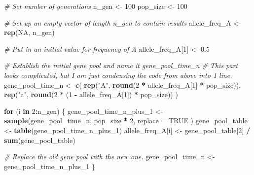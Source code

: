 \documentclass[
  a4paper]{book}
\newenvironment{Shaded}{\begin{snugshade}}{\end{snugshade}}
\newcommand{\AttributeTok}[1]{\textcolor[rgb]{0.13,0.29,0.53}{#1}}
\newcommand{\CommentTok}[1]{\textcolor[rgb]{0.56,0.35,0.01}{\textit{#1}}}
\newcommand{\ConstantTok}[1]{\textcolor[rgb]{0.56,0.35,0.01}{#1}}
\newcommand{\ControlFlowTok}[1]{\textcolor[rgb]{0.13,0.29,0.53}{\textbf{#1}}}
\newcommand{\DecValTok}[1]{\textcolor[rgb]{0.00,0.00,0.81}{#1}}
\newcommand{\FloatTok}[1]{\textcolor[rgb]{0.00,0.00,0.81}{#1}}
\newcommand{\FunctionTok}[1]{\textcolor[rgb]{0.13,0.29,0.53}{\textbf{#1}}}
\newcommand{\NormalTok}[1]{#1}
\newcommand{\OtherTok}[1]{\textcolor[rgb]{0.56,0.35,0.01}{#1}}
\newcommand{\SpecialCharTok}[1]{\textcolor[rgb]{0.81,0.36,0.00}{\textbf{#1}}}
\newcommand{\StringTok}[1]{\textcolor[rgb]{0.31,0.60,0.02}{#1}}
\begin{document}
\begin{Shaded}
\begin{Highlighting}[]
\CommentTok{\# Set number of generations}
\NormalTok{n\_gen }\OtherTok{\textless{}{-}} \DecValTok{100}
\NormalTok{pop\_size }\OtherTok{\textless{}{-}} \DecValTok{100}

\CommentTok{\# Set up an empty vector of length n\_gen to contain results}
\NormalTok{allele\_freq\_A }\OtherTok{\textless{}{-}} \FunctionTok{rep}\NormalTok{(}\ConstantTok{NA}\NormalTok{, n\_gen)}

\CommentTok{\# Put in an initial value for frequency of A}
\NormalTok{allele\_freq\_A[}\DecValTok{1}\NormalTok{] }\OtherTok{\textless{}{-}} \FloatTok{0.5}

\CommentTok{\# Establish the initial gene pool and name it gene\_pool\_time\_n}
\CommentTok{\# This part looks complicated, but I am just condensing the code from above into 1 line.}
\NormalTok{gene\_pool\_time\_n }\OtherTok{\textless{}{-}} \FunctionTok{c}\NormalTok{(}
  \FunctionTok{rep}\NormalTok{(}\StringTok{"A"}\NormalTok{, }\FunctionTok{round}\NormalTok{(}\DecValTok{2} \SpecialCharTok{*}\NormalTok{ allele\_freq\_A[}\DecValTok{1}\NormalTok{] }\SpecialCharTok{*}\NormalTok{ pop\_size)),}
  \FunctionTok{rep}\NormalTok{(}\StringTok{"a"}\NormalTok{, }\FunctionTok{round}\NormalTok{(}\DecValTok{2} \SpecialCharTok{*}\NormalTok{ (}\DecValTok{1} \SpecialCharTok{{-}}\NormalTok{ allele\_freq\_A[}\DecValTok{1}\NormalTok{]) }\SpecialCharTok{*}\NormalTok{ pop\_size))}
\NormalTok{)}

\ControlFlowTok{for}\NormalTok{ (i }\ControlFlowTok{in} \DecValTok{2}\SpecialCharTok{:}\NormalTok{n\_gen) \{}
\NormalTok{  gene\_pool\_time\_n\_plus\_1 }\OtherTok{\textless{}{-}} \FunctionTok{sample}\NormalTok{(gene\_pool\_time\_n,}
\NormalTok{    pop\_size }\SpecialCharTok{*} \DecValTok{2}\NormalTok{,}
    \AttributeTok{replace =} \ConstantTok{TRUE}
\NormalTok{  )}
\NormalTok{  gene\_pool\_table }\OtherTok{\textless{}{-}} \FunctionTok{table}\NormalTok{(gene\_pool\_time\_n\_plus\_1)}
\NormalTok{  allele\_freq\_A[i] }\OtherTok{\textless{}{-}}\NormalTok{ gene\_pool\_table[}\DecValTok{2}\NormalTok{] }\SpecialCharTok{/} \FunctionTok{sum}\NormalTok{(gene\_pool\_table)}

  \CommentTok{\# Replace the old gene pool with the new one.}
\NormalTok{  gene\_pool\_time\_n }\OtherTok{\textless{}{-}}\NormalTok{ gene\_pool\_time\_n\_plus\_1}
\NormalTok{\}}
\end{Highlighting}
\end{Shaded}
\end{document}
